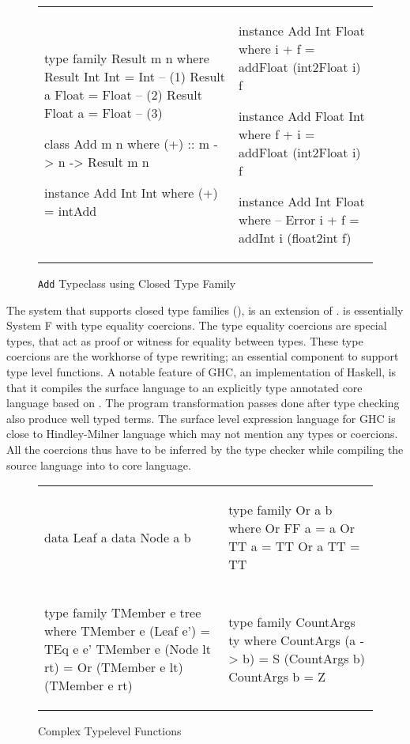 \documentclass[format=acmsmall,manuscript,review,screen,nonacm,margin=1in,11pt]{acmart}
\begin{document}
\begin{figure}[ht]
    \footnotesize
  \begin{tabular}{l l}
\begin{code}
type family Result m n where
  Result Int Int = Int   -- (1)
  Result a Float = Float -- (2)
  Result Float a = Float -- (3)

class Add m n where
  (+) :: m -> n -> Result m n

instance Add Int Int where
  (+) = intAdd
\end{code}&%
\begin{code}
instance Add Int Float where
  i + f = addFloat (int2Float i) f

instance Add Float Int where
  f + i = addFloat (int2Float i) f

instance Add Int Float where -- Error
  i + f = addInt i (float2int f)
    \end{code}
  \end{tabular}
  \caption{\texttt{Add} Typeclass using Closed Type Family}
  \label{fig:add-ty-fam}
\end{figure}
The system that supports closed type families (\CLTF{}), is an extension of \FC\cite{sulzmann_system_2007}.
\FC is essentially System F\cite{girard_proofs_1989,reynolds_towards_1974} with type equality coercions.
The type equality coercions are special types, that act as proof or witness
for equality between types. These type coercions are the workhorse of type rewriting;
an essential component to support type level functions.
A notable feature of GHC, an implementation of Haskell, is that it compiles the surface language
to an explicitly type annotated core language based on \FC. The program transformation
passes done after type checking also produce well typed \FC terms. The surface level expression
language for GHC is close to Hindley-Milner language which may not mention any types or coercions.
All the coercions thus have to be inferred by the type checker while compiling
the source language into to core language. 
\begin{figure}[ht]
    \footnotesize
  \begin{tabular}{l l}
\begin{code}
data Leaf a
data Node a b
\end{code}&%
\begin{code}
type family Or a b where
  Or FF a = a
  Or TT a = TT
  Or a TT = TT
\end{code}\\
\begin{code}
type family TMember e tree where
  TMember e (Leaf e') = TEq e e'
  TMember e (Node lt rt)
    = Or (TMember e lt) (TMember e rt)
\end{code}&%
\begin{code}
type family CountArgs ty where
  CountArgs (a -> b) = S (CountArgs b)
  CountArgs b        = Z
\end{code}
  \end{tabular}
  \caption{Complex Typelevel Functions}
  \label{fig:tf-closed-examples}
\end{figure}
\end{document}
